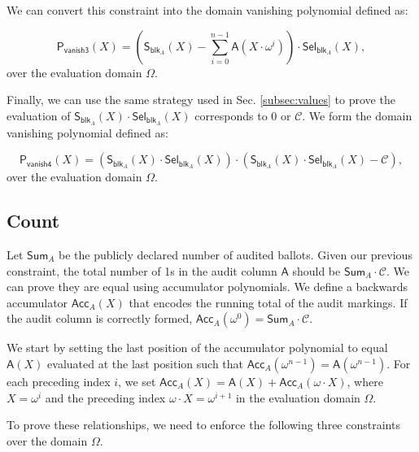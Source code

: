 We can convert this constraint into the domain vanishing polynomial defined as:

\begin{equation}
  \label{eq:3}
  \mathsf{P_{vanish3}}(X)= (\mathsf{S}_{\mathsf{blk}_A}(X) - \sum_{i=0}^{n-1}\mathsf{A}(X\cdot\omega^i))\cdot \mathsf{Sel}_{\mathsf{blk}_A}(X),
\end{equation}
over the evaluation domain $\Omega$.

Finally, we can use the same strategy used in Sec. \ref{subsec:values} to prove the evaluation of $\mathsf{S}_{\mathsf{blk}_A}(X)\cdot \mathsf{Sel}_{\mathsf{blk}_A}(X)$ corresponds to 0 or $\mathcal{C}$.
We form the domain vanishing polynomial defined as:

\begin{equation}
\label{eq:4}
\mathsf{P_{vanish4}}(X) = (\mathsf{S}_{\mathsf{blk}_A}(X)\cdot \mathsf{Sel}_{\mathsf{blk}_A}(X)) \cdot (\mathsf{S}_{\mathsf{blk}_A}(X)\cdot \mathsf{Sel}_{\mathsf{blk}_A}(X) - \mathcal{C}),
\end{equation}
over the evaluation domain $\Omega$.


\subsection{Count}
\label{subsec:count}
Let $\mathsf{Sum}_A$ be the publicly declared number of audited ballots. Given our previous constraint, the total number of 1s in the audit column $\mathsf{A}$ should be $\mathsf{Sum}_A \cdot \mathcal{C}$. 
We can prove they are equal using accumulator polynomials. 
We define a backwards accumulator $\mathsf{Acc}_A(X)$ that encodes the running total of the audit markings.
If the audit column is correctly formed, $\mathsf{Acc}_A(\omega^0) = \mathsf{Sum}_A \cdot \mathcal{C}$.

We start by setting the last position of the accumulator polynomial to equal $\mathsf{A}(X)$ evaluated at the last position such that $\mathsf{Acc}_A(\omega^{n-1}) = \mathsf{A}(\omega^{n-1})$.
For each preceding index $i$, we set $\mathsf{Acc}_A(X) = \mathsf{A}(X) + \mathsf{Acc}_A(\omega\cdot X)$, where $X=\omega^i$ and the preceding index $\omega\cdot X = \omega^{i+1}$ in the evaluation domain $\Omega$.

To prove these relationships, we need to enforce the following three constraints over the domain $\Omega$.


